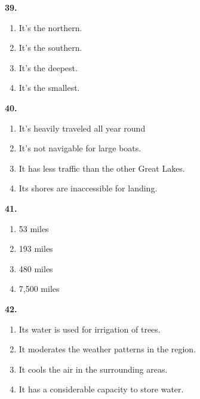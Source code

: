 \documentclass[12pt]{article}
\begin{document}
\noindent\textbf{39.}
\begin{enumerate}[label=(\Alph*),leftmargin=*,itemsep=0.2em]
\item It's the northern.
\item It's the southern.
\item It's the deepest.
\item It's the smallest.
\end{enumerate}
\par
\vspace{0.25\baselineskip}
\noindent\textbf{40.}
\begin{enumerate}[label=(\Alph*),leftmargin=*,itemsep=0.2em]
\item It's heavily traveled all year round
\item It's not navigable for large boats.
\item It has less traffic than the other Great Lakes.
\item Its shores are inaccessible for landing.
\end{enumerate}
\par
\vspace{0.25\baselineskip}
\noindent\textbf{41.}
\begin{enumerate}[label=(\Alph*),leftmargin=*,itemsep=0.2em]
\item 53 miles
\item 193 miles
\item 480 miles
\item 7,500 miles
\end{enumerate}
\par
\vspace{0.25\baselineskip}
\noindent\textbf{42.}
\begin{enumerate}[label=(\Alph*),leftmargin=*,itemsep=0.2em]
\item Its water is used for irrigation of trees.
\item It moderates the weather patterns in the region.
\item It cools the air in the surrounding areas.
\item It has a considerable capacity to store water.
\end{enumerate}
\par
\vspace{0.25\baselineskip}
\end{document}
